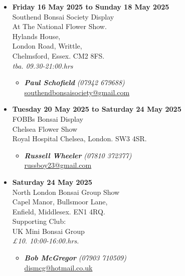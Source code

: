 \begin{itemize}
    \item \textbf{Friday 16 May 2025 to Sunday 18 May 2025}
    \\
    Southend Bonsai Society Display \\
    At The National Flower Show. \\
    Hylands House, \\
    London Road, Writtle, \\
    Chelmsford, Essex. CM2 8FS.
    \\
    \emph{tba. 09.30-21:00.hrs}
    \begin{itemize}
        \item \textbf{\emph{Paul Schofield}} \emph{(07942 679688)} \\
        \href{mailto:southendbonsaisociety@gmail.com}{southendbonsaisociety@gmail.com} 
    \end{itemize}

    \item \textbf{Tuesday 20 May 2025 to Saturday 24 May 2025}
    \\
    FOBBs Bonsai Display \\
    Chelsea Flower Show \\
    Royal Hospital Chelsea, London. SW3 4SR.
    \begin{itemize}
        \item \textbf{\emph{Russell Wheeler}} \emph{(07810 372377)} \\
        \href{mailto:russboy23@gmail.com}{russboy23@gmail.com} 
    \end{itemize}

    \item \textbf{Saturday 24 May 2025}
    \\
    North London Bonsai Group Show \\
    Capel Manor, Bullsmoor Lane, \\
    Enfield, Middlesex. EN1 4RQ. \\
    Supporting Club: \\
    UK Mini Bonsai Group
    \\
    \emph{£10. 10:00-16:00.hrs.}
    \begin{itemize}
        \item \textbf{\emph{Bob McGregor}} \emph{(07903 710509)} \\
        \href{mailto:dismcg@hotmail.co.uk}{dismcg@hotmail.co.uk} 
    \end{itemize}


\end{itemize}
